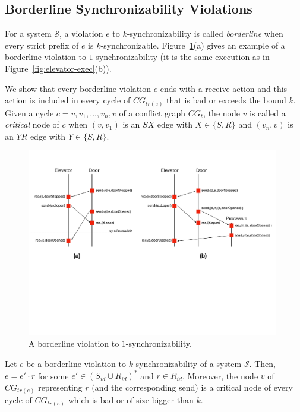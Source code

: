 \subsection{Borderline Synchronizability Violations}\label{ssec:verif1}

For a system $\mathcal{S}$, a violation $e$ to $k$-synchronizability is called \emph{borderline} when every strict prefix of 
$e$ is $k$-synchronizable. Figure~\ref{fig:ex-border-sim}(a) gives an example of a borderline violation to $1$-synchronizability (it is the same execution as in Figure~\ref{fig:elevator-exec}(b)).

We show that every borderline violation $e$ ends with a receive action and this action is included in every cycle of $CG_{tr(e)}$ that is 
bad or exceeds the bound $k$. Given a cycle $c = v,v_1,\ldots,v_n,v$ of a conflict graph $CG_t$, the node $v$ is called a \emph{critical} node of $c$ when $(v,v_1)$ is an $SX$ edge with $X\in \{S,R\}$ 
and $(v_n,v)$ is an $YR$ edge with $Y\in \{S,R\}$.


\begin{figure}[t]
\includegraphics[width=11cm]{Borderline-sim.pdf}
\caption{A borderline violation to $1$-synchronizability.}
\label{fig:ex-border-sim}
\vspace{-5mm}
\end{figure}

\begin{lemma}
Let $e$ be a borderline violation to $k$-synchronizability of a system $\mathcal{S}$. Then, $e = e'\cdot r$ for some $e'\in (S_{id}\cup R_{id})^*$ and $r\in R_{id}$.
Moreover, the node $v$ of $CG_{tr(e)}$ representing $r$ (and the corresponding send) is a critical node of every cycle of 
$CG_{tr(e)}$ which is bad or of size bigger than $k$. %
\vspace{-2mm}
\end{lemma}


